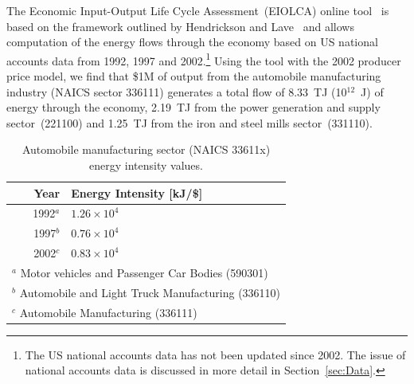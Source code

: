 The Economic Input-Output Life Cycle 
Assessment~(EIOLCA) online tool~\cite{EIOLCA2014} 
is based on the framework outlined
by Hendrickson and Lave~\cite{Hendrickson2006}
and allows computation of the energy flows through
the economy based on US national accounts data from 1992,
1997 and 2002.\footnote{The 
US national accounts
data has not been updated since 2002.
The issue of national accounts data is discussed in more
detail in Section~\ref{sec:Data}.}
Using the tool with the 2002 producer price model,
we find that \$1M of output
from the automobile manufacturing industry
(NAICS sector 336111) generates
a total flow of 8.33~TJ (10$^{12}$~J) of energy through the economy,
2.19~TJ from the power generation and 
supply sector~(221100) and 1.25~TJ from the
iron and steel mills sector~(331110).

\begin{table}
\caption[Automobile manufacturing sector energy intensity]{Automobile manufacturing 
sector (NAICS 33611x) energy intensity values.\cite{EIOLCA2014}}
\begin{center}
\begin{tabular} {r @{\hspace{2em}} l}
	\toprule
	Year & Energy Intensity [kJ/\$] \\
	\midrule
	1992$^a$ & $1.26\times10^{4}$ \\
	1997$^b$ & $0.76\times10^{4}$ \\
	2002$^c$ & $0.83\times10^{4}$ \\
	\bottomrule
	\multicolumn{2}{l}{{\scriptsize $^a$ Motor vehicles and Passenger Car Bodies (590301)}}		\\
	\multicolumn{2}{l}{{\scriptsize $^b$ Automobile and Light Truck Manufacturing (336110)}}	\\
	\multicolumn{2}{l}{{\scriptsize $^c$ Automobile Manufacturing (336111)}}
\end{tabular}
\end{center}
\label{tab:EIOLCA_auto_energy_intensities}
\end{table}

